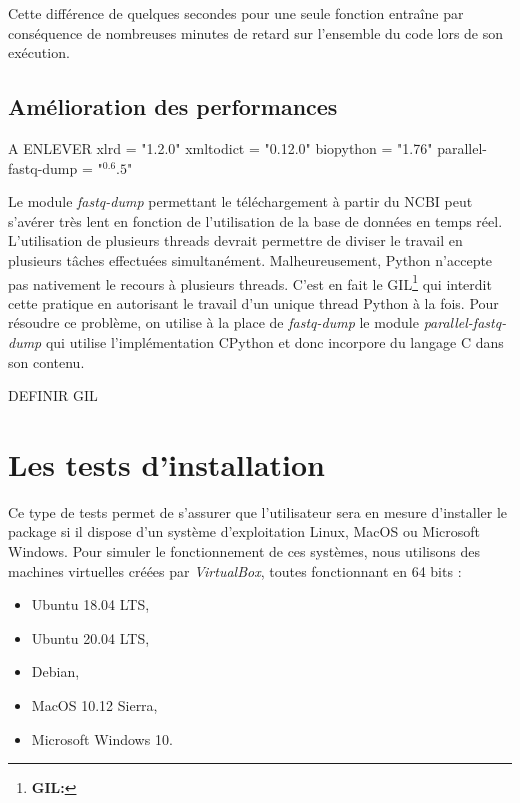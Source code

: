 \documentclass[twoside,a4paper,11pt,frenchb,openany]{report}
\begin{document}
Cette différence de quelques secondes pour une seule fonction entraîne par conséquence de nombreuses minutes de retard sur l'ensemble du code lors de son exécution.


\subsection{Amélioration des performances}

A ENLEVER
xlrd = "1.2.0"
xmltodict = "0.12.0"
biopython = "1.76"
parallel-fastq-dump = "$^0.6.5$"

Le module \textit{fastq-dump} permettant le téléchargement à partir du NCBI peut s'avérer très lent en fonction de l'utilisation de la base de données en temps réel. L'utilisation de plusieurs threads devrait permettre de diviser le travail en plusieurs tâches effectuées simultanément. Malheureusement, Python n'accepte pas nativement le recours à  plusieurs threads. C'est en fait le GIL\footnote{\textbf{GIL:} } qui interdit cette pratique en autorisant le travail d'un unique thread Python à la fois. Pour résoudre ce problème, on utilise à la place de \textit{fastq-dump} le module \textit{parallel-fastq-dump} qui utilise l'implémentation CPython et donc incorpore du langage C dans son contenu.

 

DEFINIR GIL


\section{Les tests d'installation}

Ce type de tests permet de s'assurer que l'utilisateur sera en mesure d'installer le package si il dispose d'un système d'exploitation Linux, MacOS ou Microsoft Windows. Pour simuler le fonctionnement de ces systèmes, nous utilisons des machines virtuelles créées par \textit{VirtualBox}, toutes fonctionnant en 64 bits : 
\begin{itemize}
\item Ubuntu 18.04 LTS, 
\item Ubuntu 20.04 LTS, 
\item Debian,
\item MacOS 10.12 Sierra, 
\item Microsoft Windows 10.
\end{itemize}
\end{document}
